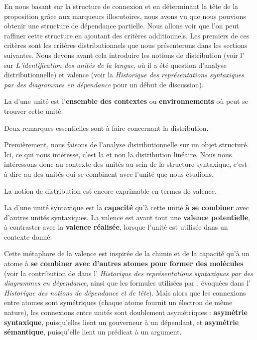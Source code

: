 En nous basant sur la structure de connexion et en déterminant la tête de la proposition grâce aux marqueurs illocutoires, nous avons vu que nous pouvions obtenir une structure de dépendance partielle. Nous allons voir que l’on peut raffiner cette structure en ajoutant des critères additionnels. Les premiers de ces critères sont les critères distributionnels que nous présenterons dans les sections suivantes. Nous devons avant cela introduire les notions de distribution (voir l' sur \textit{L’identification des unités de la langue}, où il a été question d’analyse distributionnelle) et valence (voir la  \textit{Historique des représentations syntaxiques par des diagrammes en dépendance} pour un début de discussion).

{La  d’une unité est l’\textbf{ensemble des contextes} ou \textbf{environnements} où peut se trouver cette unité.}

Deux remarques essentielles sont à faire concernant la distribution.

Premièrement, nous faisons de l’analyse distributionnelle sur un objet structuré. Ici, ce qui nous intéresse, c’est la  et non la distribution linéaire. Nous nous intéressons donc au contexte des unités au sein de la structure syntaxique, c’est-à-dire au  des unités qui se combinent avec l’unité que nous étudions.

La notion de distribution est encore exprimable en termes de valence.

{La  d’une unité syntaxique est la \textbf{capacité} qu’à cette unité \textbf{à se combiner} avec d’autres unités syntaxiques. La valence est avant tout une \textbf{valence potentielle}, à contraster avec la \textbf{valence réalisée}, lorsque l’unité est utilisée dans un contexte donné.}

Cette métaphore de la valence est inspirée de la chimie et de la capacité qu’à un atome à \textbf{se combiner avec d’autres} \textbf{atomes pour former des molécules} (voir la contribution de \citet{Peirce1897} dans l’ \textit{Historique des représentations syntaxiques par des diagrammes en dépendance}, ainsi que les formules utilisées par \citet{jespersen1937analytic}, évoquées dans l’ \textit{Historique des notions de dépendance et de tête}). Mais alors que les connexions entre atomes sont symétriques (chaque atome fournit un électron de même nature), les connexions entre unités sont doublement asymétriques : \textbf{asymétrie syntaxique}, puisqu’elles lient un gouverneur à un dépendant, et \textbf{asymétrie sémantique}, puisqu’elle lient un prédicat à un argument.

